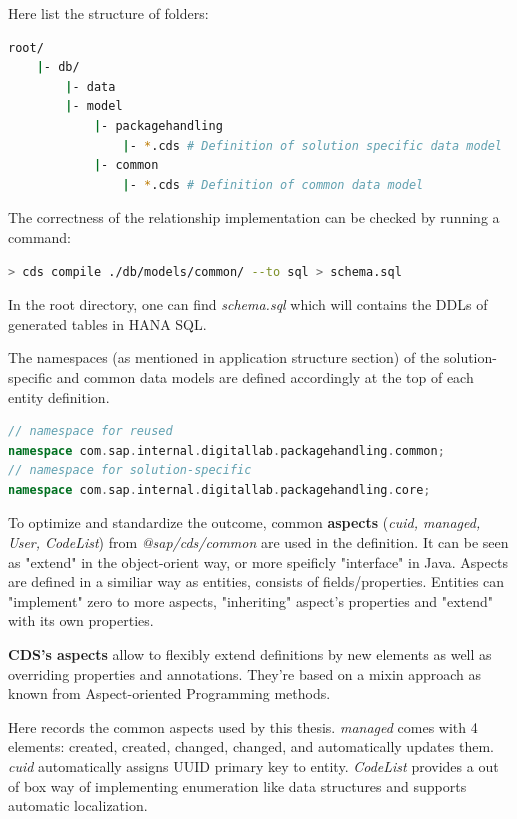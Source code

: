 Here list the structure of folders:
\begin{lstlisting}[language={bash}]
root/
    |- db/
        |- data
        |- model
            |- packagehandling 
                |- *.cds # Definition of solution specific data model
            |- common
                |- *.cds # Definition of common data model
\end{lstlisting}

The correctness of the relationship implementation can be checked by running a command:

\begin{lstlisting}[language={bash}]
> cds compile ./db/models/common/ --to sql > schema.sql
\end{lstlisting}

In the root directory, one can find \textit{schema.sql} which will contains the DDLs of generated tables in HANA SQL.

The namespaces (as mentioned in application structure section) of the solution-specific and common data models are defined accordingly at the top of each entity definition.

\begin{lstlisting}[language={c++}]
// namespace for reused
namespace com.sap.internal.digitallab.packagehandling.common; 
// namespace for solution-specific
namespace com.sap.internal.digitallab.packagehandling.core; 
\end{lstlisting}


To optimize and standardize the outcome, common \textbf{aspects} (\textit{cuid, managed, User, CodeList}) from \textit{@sap/cds/common} are used in the definition. It can be seen as "extend" in the object-orient way, or more speificly "interface" in Java. Aspects are defined in a similiar way as entities, consists of fields/properties. Entities can "implement" zero to more aspects, "inheriting" aspect's properties and "extend" with its own properties. 

\begin{definition}
    \textbf{CDS's aspects} allow to flexibly extend definitions by new elements as well as overriding properties and annotations. They're based on a mixin approach as known from Aspect-oriented Programming methods.
\end{definition}

Here records the common aspects used by this thesis. \textit{managed} comes with 4 elements: created, created, changed, changed, and automatically updates them. \textit{cuid} automatically assigns UUID primary key to entity. \textit{CodeList} provides a out of box way of implementing enumeration like data structures and supports automatic localization.

